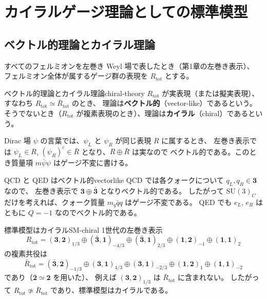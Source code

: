 \documentclass[uplatex,dvipdfmx,a4paper,11pt,openany]{jsbook}
\newcommand{\term}[2]{\textbf{#1}（#2）}
\numberwithin{equation}{chapter}
\theoremstyle{definition}
\theoremstyle{plain}
\theoremstyle{remark}
\newcommand{\SU}{\mathrm{SU}}
\begin{document}
\section{カイラルゲージ理論としての標準模型}
\subsection{ベクトル的理論とカイラル理論}
すべてのフェルミオンを左巻き Weyl 場で表したとき（第1章の左巻き表示）、
フェルミオン全体が属するゲージ群の表現を $R_{\mathrm{tot}}$ とする。
\begin{mydef}{ベクトル的理論とカイラル理論}{chiral-theory}
$R_{\mathrm{tot}}$ が実表現（または擬実表現）、すなわち $R_{\mathrm{tot}}\simeq\bar R_{\mathrm{tot}}$ のとき、
理論は\term{ベクトル的}{vector-like}であるという。
そうでないとき（$R_{\mathrm{tot}}$ が複素表現のとき）、理論は\term{カイラル}{chiral}であるという。
\end{mydef}
Dirac 場 $\psi$ の言葉では、$\psi_L$ と $\psi_R$ が同じ表現 $R$ に属するとき、
左巻き表示では $\psi_L\in R$, $(\psi_R)^c\in\bar R$ となり、$R\oplus\bar R$ は実なので
ベクトル的である。このとき質量項 $m\bar\psi\psi$ はゲージ不変に書ける。
\begin{myex}{QCD と QED はベクトル的}{vectorlike}
QCD では各クォークについて $q_L,q_R\in\mathbf 3$ なので、
左巻き表示で $\mathbf 3\oplus\bar{\mathbf 3}$ となりベクトル的である。
したがって $\SU(3)_C$ だけを考えれば、クォーク質量 $m_q\bar qq$ はゲージ不変である。
QED でも $e_L$, $e_R$ はともに $Q=-1$ なのでベクトル的である。
\end{myex}
\begin{myex}{標準模型はカイラル}{SM-chiral}
1世代の左巻き表示
\begin{equation}
R_{\mathrm{tot}}
=(\mathbf3,\mathbf2)_{1/3}
\oplus(\bar{\mathbf3},\mathbf1)_{-4/3}
\oplus(\bar{\mathbf3},\mathbf1)_{2/3}
\oplus(\mathbf1,\mathbf2)_{-1}
\oplus(\mathbf1,\mathbf1)_{2}
\end{equation}
の複素共役は
\begin{equation}
\bar R_{\mathrm{tot}}
=(\bar{\mathbf3},\mathbf2)_{-1/3}
\oplus(\mathbf3,\mathbf1)_{4/3}
\oplus(\mathbf3,\mathbf1)_{-2/3}
\oplus(\mathbf1,\mathbf2)_{1}
\oplus(\mathbf1,\mathbf1)_{-2}
\end{equation}
であり（$\bar{\mathbf2}\simeq\mathbf2$ を用いた）、
例えば $(\mathbf3,\mathbf2)_{1/3}$ は $\bar R_{\mathrm{tot}}$ に含まれない。
したがって $R_{\mathrm{tot}}\not\simeq\bar R_{\mathrm{tot}}$ であり、標準模型はカイラルである。
\end{myex}
\end{document}
